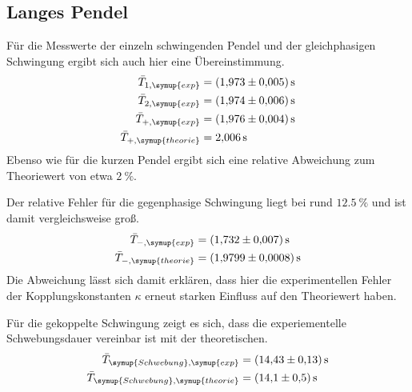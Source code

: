 \subsection{Langes Pendel}
Für die Messwerte der einzeln schwingenden Pendel und der gleichphasigen Schwingung ergibt sich auch hier eine Übereinstimmung. 
\begin{align*}
    \bar{T}_{1,\symup{exp}} &= \qty{1.973+-0.005}{\second} \\
    \bar{T}_{2,\symup{exp}} &= \qty{1.974+-0.006}{\second} \\
    \bar{T}_{+,\symup{exp}} &= \qty{1.976+-0.004}{\second} \\
    \bar{T}_{+,\symup{theorie}} &= \qty{2.006}{\second} 
\end{align*}
Ebenso wie für die kurzen Pendel ergibt sich eine relative Abweichung zum Theoriewert von etwa $\qty{2}{\percent}$.

Der relative Fehler für die gegenphasige Schwingung liegt bei rund $\qty{12,5}{\percent}$ und ist damit vergleichsweise groß.
\begin{align*}
    \bar{T}_{-,\symup{exp}} &= \qty{1.732+-0.007}{\second} \\
    \bar{T}_{-,\symup{theorie}} &= \qty{1.9799+-0.0008}{\second}
\end{align*}
Die Abweichung lässt sich damit erklären, dass hier die experimentellen Fehler der Kopplungskonstanten $\kappa$ erneut starken Einfluss auf 
den Theoriewert haben.

Für die gekoppelte Schwingung zeigt es sich, dass die experiementelle Schwebungsdauer vereinbar ist mit der theoretischen.
\begin{align*}
    \bar{T}_{\symup{Schwebung},\symup{exp}} &= \qty{14.43+-0.13}{\second} \\
    \bar{T}_{\symup{Schwebung},\symup{theorie}} &= \qty{14.1+-0.5}{\second}
\end{align*}

